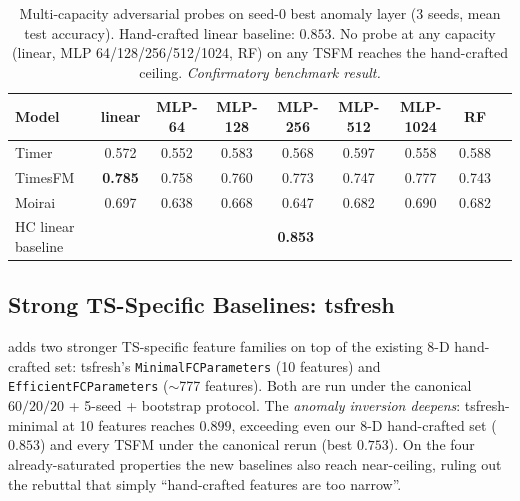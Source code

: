 \documentclass{article}
\begin{document}
\begin{table}[htbp]
\caption{Multi-capacity adversarial probes on seed-0 best anomaly layer (3 seeds, mean test accuracy). Hand-crafted linear baseline: $0.853$. No probe at any capacity (linear, MLP 64/128/256/512/1024, RF) on any TSFM reaches the hand-crafted ceiling. \emph{Confirmatory benchmark result.}}
\label{tab:multicapacity_anomaly}
\centering
\small
\begin{tabular}{lcccccccc}
\toprule
Model & linear & MLP-64 & MLP-128 & MLP-256 & MLP-512 & MLP-1024 & RF \\
\midrule
Timer    & 0.572 & 0.552 & 0.583 & 0.568 & 0.597 & 0.558 & 0.588 \\
TimesFM  & \textbf{0.785} & 0.758 & 0.760 & 0.773 & 0.747 & 0.777 & 0.743 \\
Moirai   & 0.697 & 0.638 & 0.668 & 0.647 & 0.682 & 0.690 & 0.682 \\
\midrule
HC linear baseline & \multicolumn{7}{c}{\textbf{0.853}} \\
\bottomrule
\end{tabular}
\end{table}

\subsection{Strong TS-Specific Baselines: tsfresh}
\label{sec:strong_baselines}

 adds two stronger TS-specific feature families on top of the existing 8-D hand-crafted set: tsfresh's \texttt{MinimalFCParameters} (10 features) and \texttt{EfficientFCParameters} ($\sim$777 features). Both are run under the canonical $60/20/20$ + 5-seed + bootstrap protocol. The \emph{anomaly inversion deepens}: tsfresh-minimal at 10 features reaches $0.899$, exceeding even our 8-D hand-crafted set ($0.853$) and every TSFM under the canonical rerun (best $0.753$). On the four already-saturated properties the new baselines also reach near-ceiling, ruling out the rebuttal that simply ``hand-crafted features are too narrow''.
\end{document}
